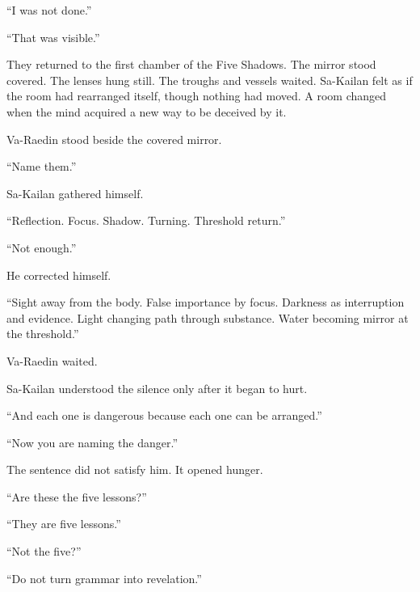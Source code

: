 “I was not done.”\par

“That was visible.”\par

They returned to the first chamber of the Five Shadows.
The mirror stood covered.
The lenses hung still.
The troughs and vessels waited.
Sa-Kailan felt as if the room had rearranged itself, though nothing had moved.
A room changed when the mind acquired a new way to be deceived by it.\par

Va-Raedin stood beside the covered mirror.\par

“Name them.”\par

Sa-Kailan gathered himself.\par

“Reflection.
Focus.
Shadow.
Turning.
Threshold return.”\par

“Not enough.”\par

He corrected himself.\par

“Sight away from the body.
False importance by focus.
Darkness as interruption and evidence.
Light changing path through substance.
Water becoming mirror at the threshold.”\par

Va-Raedin waited.\par

Sa-Kailan understood the silence only after it began to hurt.\par

“And each one is dangerous because each one can be arranged.”\par

“Now you are naming the danger.”\par

The sentence did not satisfy him.
It opened hunger.\par

“Are these the five lessons?”\par

“They are five lessons.”\par

“Not the five?”\par

“Do not turn grammar into revelation.”\par

